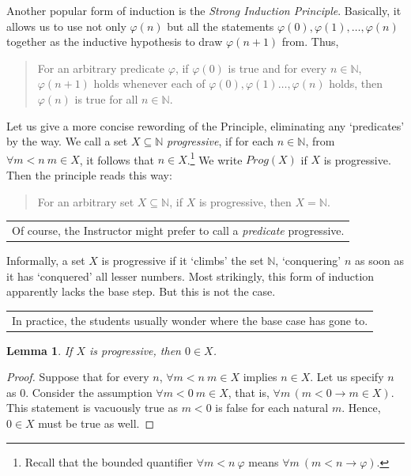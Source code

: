 \documentclass[12pt,notitlepage]{article}
\theoremstyle{plain}
\newtheorem{lemma}[thm]{Lemma}
\theoremstyle{definition}
\theoremstyle{plain}
\newcommand{\N}{\mathbb{N}}
\newcommand{\sbs}{\subseteq}
\renewcommand{\phi}{\varphi}
\newcommand{\1}{\mathbf{1}}
\newcommand{\0}{\mathbf{0}}
\newcommand{\mcomm}[1]{
\medskip\noindent\begin{tabular}{| l}
\parbox{0.99\textwidth}{{\small
#1 }}\end{tabular}
\smallskip}
\begin{document}
Another popular form of induction is the \emph{Strong Induction Principle}. Basically, it allows us to use not only $\phi(n)$ but all the statements $\phi(0), \phi(1),\ldots, \phi(n)$ together as the inductive hypothesis to draw $\phi(n+1)$ from. Thus,
\begin{quote}
For an arbitrary predicate $\phi$, if $\phi(0)$ is true and for every $n \in \N$, $\phi(n+1)$ holds whenever each of $\phi(0), \phi(1) \ldots, \phi(n)$ holds, then $\phi(n)$ is true for all $n \in \N$.
\end{quote}
Let us give a more concise rewording of the Principle, eliminating any `predicates' by the way. We call a set $X \sbs \N$ \emph{progressive}, if for each $n \in \N$, from  $\forall m < n\  m \in X$, it follows that $n \in X$.\footnote{Recall that the bounded quantifier $\forall m < n\ \phi$ means $\forall m\ (m < n \to \phi)$.} We write $Prog(X)$ if $X$ is progressive. Then the principle reads this way:
\begin{quote}
For an arbitrary set $X \sbs \N$, if $X$ is progressive, then $X = \N$.
\end{quote}
\mcomm{Of course, the Instructor might prefer to call a \emph{predicate} progressive.}

Informally, a set $X$ is progressive if it `climbs' the set $\N$, `conquering' $n$ as soon as it has `conquered' all lesser numbers. Most strikingly, this form of induction apparently lacks the base step. But this is not the case.

\mcomm{In practice, the students usually wonder where the base case has gone to.}
\begin{lemma}
If $X$ is progressive, then $0 \in X$.
\end{lemma}
\begin{proof}
Suppose that for every $n$, $\forall m < n\ m \in X$ implies $n \in X$. Let us specify $n$ as $0$. Consider the assumption $\forall m < 0\  m \in X$, that is, $\forall m\, (m < 0 \to m \in X)$. This statement is vacuously true as $m < 0$ is false for each natural $m$. Hence, $0 \in X$ must be true as well.
\end{proof}
\end{document}
